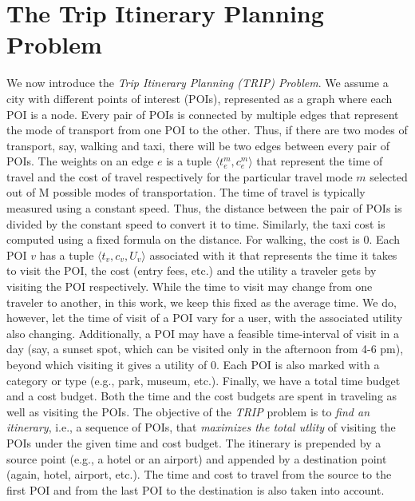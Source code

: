 \section{The Trip Itinerary Planning Problem}
\label{sec:problem}

We now introduce the \emph{Trip Itinerary Planning (TRIP) Problem}.
We assume a city with different points of interest (POIs),
represented as a graph where each POI is a node.  Every pair of POIs
is connected by multiple edges that represent the mode of transport
from one POI to the other.  Thus, if there are two modes of
transport, say, walking and taxi, there will be two edges between every
pair of POIs.  The weights on an edge $e$ is a tuple $\langle t^{m}_e,
c^{m}_e \rangle$ that represent the time of travel and the cost of travel
respectively for the particular travel mode $m$ selected out of M possible modes of transportation.  The time of travel is
typically measured using a constant speed.  Thus, the distance
between the pair of POIs is divided by the constant speed to convert it
to time.  Similarly, the taxi cost is computed using a fixed formula
on the distance.  For walking, the cost is $0$.  Each POI $v$ has a
tuple $\langle t_v, c_v, U_v \rangle$ associated with it that
represents the time it takes to visit the POI, the cost (entry fees,
etc.) and the utility a traveler gets by visiting the POI
respectively.  While the
time to visit may change from one traveler to another, in this work,
we keep this fixed as the average time.  We do, however, let the time of visit of a POI
vary for a user, with the associated
utility also changing.  Additionally, a POI may have a feasible
time-interval of visit in a day (say, a sunset spot, which can be
visited only in the afternoon from 4-6 pm), beyond which visiting it
gives a utility of $0$.  Each POI is also marked with a category or type (e.g.,
park, museum, etc.).  Finally, we have a total time budget and a cost
budget.  Both the time and the cost budgets are spent in traveling as
well as visiting the POIs.  The objective of the \emph{TRIP} problem
is to \emph{find an itinerary}, i.e., a sequence of POIs, that
\emph{maximizes the total utlity} of visiting the POIs under the
given time and cost budget.  The itinerary is prepended by a source
point (e.g., a hotel or an airport) and appended by a destination
point (again, hotel, airport, etc.).  The time and cost to travel
from the source to the first POI and from the last POI to the
destination is also taken into account.

